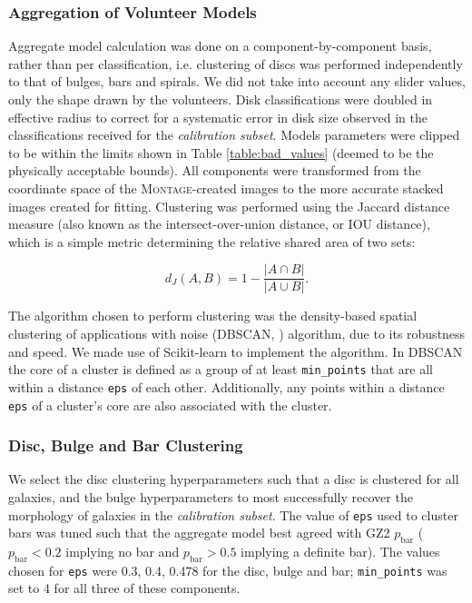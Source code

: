 \documentclass[main\.tex]{subfiles}
\begin{document}
\subsubsection{Aggregation of Volunteer Models}
\label{sec:aggregation_of_volunteer_models}

Aggregate model calculation was done on a component-by-component basis, rather than per classification, i.e. clustering of discs was performed independently to that of bulges, bars and spirals. We did not take into account any slider values, only the shape drawn by the volunteers. Disk classifications were doubled in effective radius to correct for a systematic error in disk size observed in the classifications received for the \textit{calibration subset}. Models parameters were clipped to be within the limits shown in Table \ref{table:bad_values} (deemed to be the physically acceptable bounds). All components were transformed from the coordinate space of the \textsc{Montage}-created images to the more accurate stacked images created for fitting. Clustering was performed using the Jaccard distance measure (also known as the intersect-over-union distance, or IOU distance), which is a simple metric determining the relative shared area of two sets:

\begin{equation}
d_J(A, B) = 1 - \frac{|A \cap B|}{|A \cup B|}.
\end{equation}

The algorithm chosen to perform clustering was the density-based spatial clustering of applications with noise (DBSCAN, \citealt{dbscan}) algorithm, due to its robustness and speed. We made use of Scikit-learn \citep{scikit-learn} to implement the algorithm. In DBSCAN the core of a cluster is defined as a group of at least \texttt{min\_points} that are all within a distance \texttt{eps} of each other. Additionally, any points within a distance \texttt{eps} of a cluster's core are also associated with the cluster.

\subsubsection{Disc, Bulge and Bar Clustering}

We select the disc clustering hyperparameters such that a disc is clustered for all galaxies, and the bulge hyperparameters to most successfully recover the morphology of galaxies in the \textit{calibration subset}. The value of \texttt{eps} used to cluster bars was tuned such that the aggregate model best agreed with GZ2 $p_\mathrm{bar}$ ($p_\mathrm{bar} < 0.2$ implying no bar and $p_\mathrm{bar} > 0.5$ implying a definite bar). The values chosen for \texttt{eps} were 0.3, 0.4, 0.478 for the disc, bulge and bar; \texttt{min\_points} was set to 4 for all three of these components.
\end{document}
